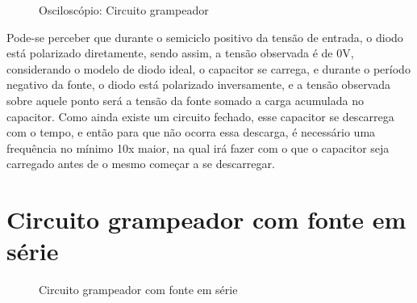 \begin{figure}[H]
    \centering
    \caption{Osciloscópio: Circuito grampeador}
    \vspace{-0.3cm}
    \label{fig:OsciloscopioCircuito05}
\end{figure}

Pode-se perceber que durante o semiciclo positivo da tensão de entrada, o diodo está polarizado diretamente, sendo assim, a tensão observada é de 0V, considerando o modelo de diodo ideal, o capacitor se carrega, e durante o período negativo da fonte, o diodo está polarizado inversamente, e a tensão observada sobre aquele ponto será a tensão da fonte somado a carga acumulada no capacitor. Como ainda existe um circuito fechado, esse capacitor se descarrega com o tempo, e então para que não ocorra essa descarga, é necessário uma frequência no mínimo 10x maior, na qual irá fazer com o que o capacitor seja carregado antes de o mesmo começar a se descarregar.

\section{Circuito grampeador com fonte em série}

\begin{figure}[H]
    \centering
    \caption{Circuito grampeador com fonte em série}
    \vspace{-0.3cm}
    \label{fig:ImagemSlide06}
\end{figure}


